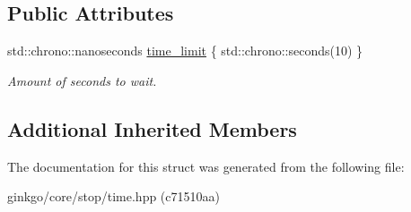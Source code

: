 \subsection*{Public Attributes}
\begin{DoxyCompactItemize}
\item 
\mbox{\label{structgko_1_1stop_1_1Time_1_1parameters__type_aee1d09b9ec4e73561e46e94888cf885a}} 
std\+::chrono\+::nanoseconds \hyperlink{structgko_1_1stop_1_1Time_1_1parameters__type_aee1d09b9ec4e73561e46e94888cf885a}{time\+\_\+limit} \{ std\+::chrono\+::seconds(10) \}
\begin{DoxyCompactList}\small\item\em Amount of seconds to wait. \end{DoxyCompactList}\end{DoxyCompactItemize}
\subsection*{Additional Inherited Members}


The documentation for this struct was generated from the following file\+:\begin{DoxyCompactItemize}
\item 
ginkgo/core/stop/time.\+hpp (c71510aa)\end{DoxyCompactItemize}
